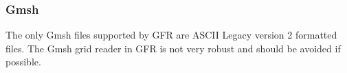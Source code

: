 \subsubsection{Gmsh}
\label{SEC:Files:Grid_Input:Gmsh}

The only Gmsh files supported by GFR are ASCII Legacy version 2 formatted
files.
%
The Gmsh grid reader in GFR is not very robust and should be avoided if
possible.


